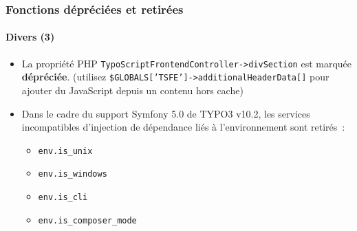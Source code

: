 \begin{frame}[fragile]
	\frametitle{Fonctions dépréciées et retirées}
	\framesubtitle{Divers (3)}

	\lstset{basicstyle=\tiny\ttfamily}

	\begin{itemize}

		\item La propriété PHP \texttt{TypoScriptFrontendController->divSection} est marquée \textbf{dépréciée}.\newline
			\smaller
				(utilisez \texttt{\$GLOBALS['TSFE']->additionalHeaderData[]} pour ajouter du JavaScript depuis un contenu hors cache)
			\normalsize

		\item Dans le cadre du support Symfony 5.0 de TYPO3 v10.2, les services incompatibles d'injection de dépendance
			liés à l'environnement sont retirés~:

			\begin{itemize}
				\item \texttt{env.is\_unix}
				\item \texttt{env.is\_windows}
				\item \texttt{env.is\_cli}
				\item \texttt{env.is\_composer\_mode}
			\end{itemize}

	\end{itemize}

\end{frame}

